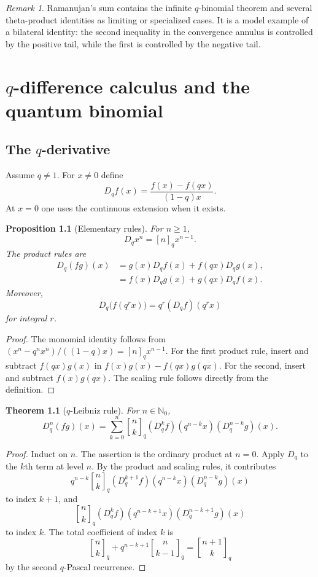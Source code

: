 \documentclass[11pt,oneside,openany]{book}
\newtheorem{theorem}{Theorem}[chapter]
\newtheorem{proposition}[proposition]{Proposition}
\theoremstyle{definition}
\theoremstyle{remark}
\newtheorem{remark}[remark]{Remark}
\newcommand{\qbinom}[2]{\genfrac{[}{]}{0pt}{}{#1}{#2}_{q}}
\newcommand{\N}{\mathbb N}
\begin{document}
\begin{remark}
Ramanujan's sum contains the infinite $q$-binomial theorem and several theta-product identities as limiting or specialized cases.  It is a model example of a bilateral identity: the second inequality in the convergence annulus is controlled by the positive tail, while the first is controlled by the negative tail.
\end{remark}


\chapter{\texorpdfstring{$q$}{q}-difference calculus and the quantum binomial}\label{chap:qcalculus}

\section{The \texorpdfstring{$q$}{q}-derivative}

Assume $q\ne1$.  For $x\ne0$ define
\[
 D_qf(x)=\frac{f(x)-f(qx)}{(1-q)x}.
\]
At $x=0$ one uses the continuous extension when it exists.

\begin{proposition}[Elementary rules]\label{prop:qderivative-rules}
For $n\ge1$,
\[
 D_qx^n=[n]_qx^{n-1}.
\]
The product rules are
\begin{align*}
 D_q(fg)(x)&=g(x)D_qf(x)+f(qx)D_qg(x),\\
 &=f(x)D_qg(x)+g(qx)D_qf(x).
\end{align*}
Moreover,
\[
 D_q\bigl(f(q^rx)\bigr)=q^r(D_qf)(q^rx)
\]
for integral $r$.
\end{proposition}

\begin{proof}
The monomial identity follows from
\(
 (x^n-q^nx^n)/((1-q)x)=[n]_qx^{n-1}.
\)
For the first product rule, insert and subtract $f(qx)g(x)$ in
\(
 f(x)g(x)-f(qx)g(qx).
\)
For the second, insert and subtract $f(x)g(qx)$.  The scaling rule follows directly from the definition.
\end{proof}

\begin{theorem}[$q$-Leibniz rule]\label{thm:q-leibniz}
For $n\in\N_0$,
\[
 D_q^n(fg)(x)
 =\sum_{k=0}^{n}\qbinom nk
 (D_q^kf)(q^{n-k}x)(D_q^{n-k}g)(x).
\]
\end{theorem}

\begin{proof}
Induct on $n$.  The assertion is the ordinary product at $n=0$.  Apply $D_q$ to the $k$th term at level $n$.  By the product and scaling rules, it contributes
\[
 q^{n-k}\qbinom nk
 (D_q^{k+1}f)(q^{n-k}x)(D_q^{n-k}g)(x)
\]
to index $k+1$, and
\[
 \qbinom nk(D_q^kf)(q^{n-k+1}x)(D_q^{n-k+1}g)(x)
\]
to index $k$.  The total coefficient of index $k$ is
\[
 \qbinom nk+q^{n-k+1}\qbinom n{k-1}
 =\qbinom{n+1}k
\]
by the second $q$-Pascal recurrence.
\end{proof}
\end{document}

